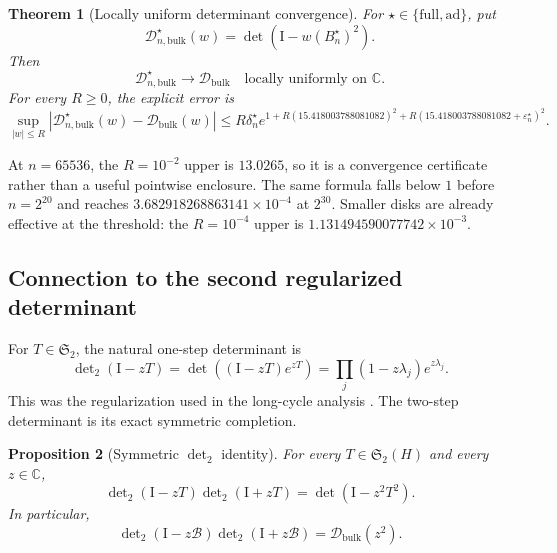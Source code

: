 \documentclass[11pt]{article}
\newtheorem{theorem}{Theorem}[section]
\newtheorem{proposition}[theorem]{Proposition}
\theoremstyle{definition}
\theoremstyle{remark}
\newcommand{\C}{\mathbb C}
\newcommand{\Id}{\mathrm I}
\newcommand{\cB}{\mathcal B}
\newcommand{\cD}{\mathcal D}
\newcommand{\detF}{\operatorname{det}}
\newcommand{\Dettwo}{\operatorname{det}\nolimits_2}
\begin{document}
\begin{theorem}[Locally uniform determinant convergence]
\label{thm:determinant-convergence}
For $\star\in\{\mathrm{full},\mathrm{ad}\}$, put
\begin{equation}
 \cD_{n,\mathrm{bulk}}^\star(w)
 =\detF\!\left(\Id-w(B_n^\star)^2\right).
 \label{eq:discrete-square-determinant}
\end{equation}
Then
\begin{equation}
 \cD_{n,\mathrm{bulk}}^\star
 \longrightarrow\cD_{\mathrm{bulk}}
 \quad\text{locally uniformly on }\C.
 \label{eq:local-uniform}
\end{equation}
For every $R\ge0$, the explicit error is
\begin{equation}
 \sup_{|w|\le R}
 \left|\cD_{n,\mathrm{bulk}}^\star(w)
       -\cD_{\mathrm{bulk}}(w)\right|
 \le R\delta_n^\star
 e^{1+R(15.418003788081082)^2
      +R(15.418003788081082+\varepsilon_n^\star)^2}.
 \label{eq:validated-determinant-bound}
\end{equation}
\end{theorem}

At $n=65536$, the $R=10^{-2}$ upper is $13.0265$, so it is a convergence
certificate rather than a useful pointwise enclosure.  The same formula
falls below $1$ before $n=2^{20}$ and reaches
$3.682918268863141\times10^{-4}$ at $2^{30}$.  Smaller disks are already
effective at the threshold: the $R=10^{-4}$ upper is
$1.131494590077742\times10^{-3}$.

\subsection{Connection to the second regularized determinant}

For $T\in\mathfrak S_2$, the natural one-step determinant is
\begin{equation}
 \Dettwo(\Id-zT)
 =\detF\!\left((\Id-zT)e^{zT}\right)
 =\prod_j(1-z\lambda_j)e^{z\lambda_j}.
 \label{eq:det2-definition}
\end{equation}
This was the regularization used in the long-cycle analysis
\citep{WangLongCycle2026}.  The two-step determinant is its exact symmetric
completion.

\begin{proposition}[Symmetric $\det_2$ identity]
\label{prop:symmetric-det2}
For every $T\in\mathfrak S_2(H)$ and every $z\in\C$,
\begin{equation}
 \Dettwo(\Id-zT)\Dettwo(\Id+zT)
 =\detF(\Id-z^2T^2).
 \label{eq:symmetric-det2}
\end{equation}
In particular,
\begin{equation}
 \Dettwo(\Id-z\cB)\Dettwo(\Id+z\cB)
 =\cD_{\mathrm{bulk}}(z^2).
 \label{eq:bulk-symmetric-det2}
\end{equation}
\end{proposition}
\end{document}
